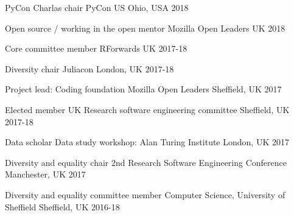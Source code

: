 


\begin{cvhonors}

\cvhonor
{PyCon Charlas chair} %
{PyCon US} %
{ Ohio, USA} %
{2018} %

\cvhonor
{Open source / working in the open mentor} %
{Mozilla Open Leaders} %
{ UK} %
{2018} %

\cvhonor
{Core committee member} %
{RForwards} %
{ UK} %
{2017-18} %

\cvhonor
{Diversity chair} %
{Juliacon} %
{London, UK} %
{2017-18} %


\cvhonor
{Project lead: Coding foundation} %
{Mozilla Open Leaders} %
{Sheffield, UK} %
{2017} %

\cvhonor
{Elected member} %
{UK Research software engineering committee} %
{Sheffield, UK} %
{2017-18} %

\cvhonor
{Data scholar} %
{Data study workshop: Alan Turing Institute} %
{London, UK} %
{2017} %


\cvhonor
{Diversity and equality chair} %
{2nd Research Software Engineering Conference} %
{Manchester, UK} %
{2017} %


\cvhonor
{Diversity and equality committee member} %
{Computer Science, University of Sheffield} %
{Sheffield, UK} %
{2016-18} %


\end{cvhonors}
